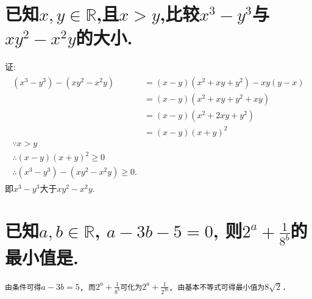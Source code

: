 \documentclass[oneside]{book}
\newcommand{\1}{\underline{\makebox[1cm]{}}}
\newcommand{\2}{\underline{\makebox[2cm]{}}}
\newcommand{\3}{\underline{\makebox[3cm]{}}}
\newcommand{\4}{\underline{\makebox[4cm]{}}}
\newcommand{\lge}{\large \texttt}
\newlength{\la}
\begin{document}
        \section{已知$x,y\in \mathbb{R}$,且$x>y$,比较$x^3-y^3$与$xy^2-x^2y$的大小.}
        {\large
            证:\\
            \begin{align}
                \begin{aligned}
                    (x^3-y^3)-(xy^2-x^2y) &= (x-y)(x^2+xy+y^2)-xy(y-x)\nonumber\\
                    &=(x-y)(x^2+xy+y^2+xy)\\
                    &=(x-y)(x^2+2xy+y^2)\\
                    &=(x-y)(x+y)^2\\
                    \because x>y\\
                    \therefore (x-y)(x+y)^2 \geq 0\\
                    \therefore(x^3-y^3)-(xy^2-x^2y) \geq 0.
                \end{aligned}
            \end{align} 
            即$x^3-y^3$大于$xy^2-x^2y$.\\
        }
        \rightline{$\blacksquare$}

        \section{已知$a, b \in \mathbb{R}$, $a - 3b - 5 = 0$, 则$2^a + \frac{1}{8^b}$的最小值是\2.}
        \lge{由条件可得$a - 3b = 5$, 而$2^a + \frac{1}{8^b}$可化为$2^a + \frac{1}{2^{3b}}$, 由基本不等式可得最小值为$8\sqrt{2}$.}
\end{document}
